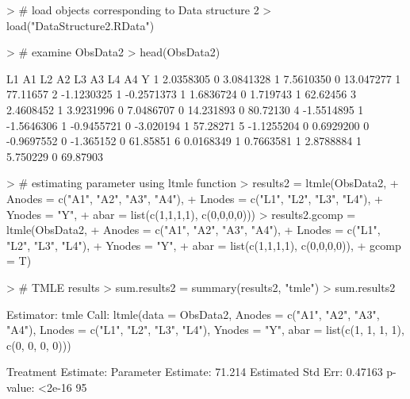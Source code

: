 \documentclass{exam}
\begin{document}
\begin{solution}
\begin{Schunk}
\begin{Sinput}
> # load objects corresponding to Data structure 2
> load("DataStructure2.RData")
\end{Sinput}
\end{Schunk}
\begin{Schunk}
\begin{Sinput}
> # examine ObsData2
> head(ObsData2)
\end{Sinput}
\begin{Soutput}
          L1 A1         L2 A2         L3 A3        L4 A4        Y
1  2.0358305  0  3.0841328  1  7.5610350  0 13.047277  1 77.11657
2 -1.1230325  1 -0.2571373  1  1.6836724  0  1.719743  1 62.62456
3  2.4608452  1  3.9231996  0  7.0486707  0 14.231893  0 80.72130
4 -1.5514895  1 -1.5646306  1 -0.9455721  0 -3.020194  1 57.28271
5 -1.1255204  0  0.6929200  0 -0.9697552  0 -1.365152  0 61.85851
6  0.0168349  1  0.7663581  1  2.8788884  1  5.750229  0 69.87903
\end{Soutput}
\end{Schunk}
\begin{Schunk}
\begin{Sinput}
> # estimating parameter using ltmle function
> results2 = ltmle(ObsData2, 
+                  Anodes = c("A1", "A2", "A3", "A4"), 
+                  Lnodes = c("L1", "L2", "L3", "L4"), 
+                  Ynodes = "Y", 
+                  abar = list(c(1,1,1,1), c(0,0,0,0)))
> results2.gcomp = ltmle(ObsData2, 
+                        Anodes = c("A1", "A2", "A3", "A4"), 
+                        Lnodes = c("L1", "L2", "L3", "L4"), 
+                        Ynodes = "Y", 
+                        abar = list(c(1,1,1,1), c(0,0,0,0)),
+                        gcomp = T)
\end{Sinput}
\end{Schunk}
\begin{Schunk}
\begin{Sinput}
> # TMLE results
> sum.results2 = summary(results2, "tmle")
> sum.results2
\end{Sinput}
\begin{Soutput}
Estimator:  tmle 
Call:
ltmle(data = ObsData2, Anodes = c("A1", "A2", "A3", "A4"), Lnodes = c("L1", 
    "L2", "L3", "L4"), Ynodes = "Y", abar = list(c(1, 1, 1, 1), 
    c(0, 0, 0, 0)))

Treatment Estimate:
   Parameter Estimate:  71.214 
    Estimated Std Err:  0.47163 
              p-value:  <2e-16 
    95%


\end{Soutput}
\end{Schunk}
\end{solution}
\end{document}
